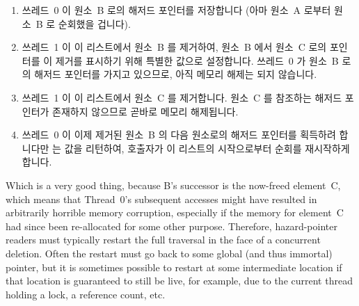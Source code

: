 \fi

\begin{enumerate}
\item	쓰레드~0 이 원소~B 로의 해저드 포인터를 저장합니다
	(아마 원소~A 로부터 원소~B 로 순회했을 겁니다).
\item	쓰레드~1 이 이 리스트에서 원소~B 를 제거하여, 원소~B 에서 원소~C 로의
	포인터를 이 제거를 표시하기 위해 특별한  값으로
	설정합니다.
	쓰레드~0 가 원소~B 로의 해저드 포인터를 가지고 있으므로, 아직 메모리
	해제는 되지 않습니다.
\item	쓰레드~1 이 이 리스트에서 원소~C 를 제거합니다.
	원소~C 를 참조하는 해저드 포인터가 존재하지 않으므로 곧바로 메모리
	해제됩니다.
\item	쓰레드~0 이 이제 제거된 원소~B 의 다음 원소로의 해저드 포인터를
	획득하려 합니다만  는  값을
	리턴하여, 호출자가 이 리스트의 시작으로부터 순회를 재시작하게 합니다.

\end{enumerate}

Which is a very good thing, because B's successor is the now-freed
element~C, which means that Thread~0's subsequent accesses might have
resulted in arbitrarily horrible memory corruption, especially if the
memory for element~C had since been re-allocated for some other purpose.
Therefore, hazard-pointer readers must typically restart the full
traversal in the face of a concurrent deletion.
Often the restart must go back to some global (and thus immortal) pointer,
but it is sometimes possible to restart at some intermediate location
if that location is guaranteed to still be live, for example, due to
the current thread holding a lock, a reference count, etc.

